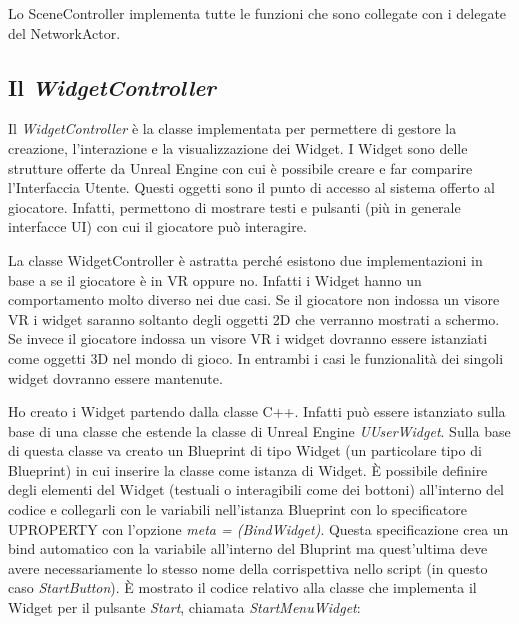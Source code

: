     Lo SceneController implementa tutte le funzioni che sono collegate con i delegate del NetworkActor.

    \subsection{Il \textit{WidgetController}}

    Il \textit{WidgetController} è la classe implementata per permettere di gestore la creazione, l'interazione e la visualizzazione dei Widget.
    I Widget sono delle strutture offerte da Unreal Engine con cui è possibile creare e far comparire l'Interfaccia Utente.
    Questi oggetti sono il punto di accesso al sistema offerto al giocatore.
    Infatti, permettono di mostrare testi e pulsanti (più in generale interfacce UI) con cui il giocatore può interagire.

    La classe WidgetController è astratta perché esistono due implementazioni in base a se il giocatore è in VR oppure no. 
    Infatti i Widget hanno un comportamento molto diverso nei due casi.
    Se il giocatore non indossa un visore VR i widget saranno soltanto degli oggetti 2D che verranno mostrati a schermo.
    Se invece il giocatore indossa un visore VR i widget dovranno essere istanziati come oggetti 3D nel mondo di gioco.
    In entrambi i casi le funzionalità dei singoli widget dovranno essere mantenute.

    Ho creato i Widget partendo dalla classe C++.
    Infatti può essere istanziato sulla base di una classe che estende la classe di Unreal Engine \textit{UUserWidget}.
    Sulla base di questa classe va creato un Blueprint di tipo Widget (un particolare tipo di Blueprint) in cui inserire la classe come istanza di Widget. 
    È possibile definire degli elementi del Widget (testuali o interagibili come dei bottoni) all'interno del codice e collegarli con le variabili nell'istanza Blueprint con lo specificatore UPROPERTY con l'opzione \textit{meta = (BindWidget)}.
    Questa specificazione crea un bind automatico con la variabile all'interno del Bluprint ma quest'ultima deve avere necessariamente lo stesso nome della corrispettiva nello script (in questo caso \textit{StartButton}).
    È mostrato il codice relativo alla classe che implementa il Widget per il pulsante \textit{Start}, chiamata \textit{StartMenuWidget}:

